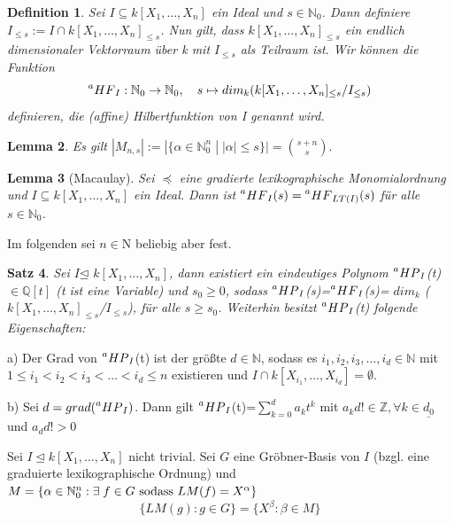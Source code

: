 \documentclass{article}
\newtheorem{satz}{Satz}
\newtheorem{definition}[satz]{Definition}
\newtheorem{lemma}[satz]{Lemma}
\newcommand*{\R}{k[X_{1},\ldots,X_{n}]}
\newcommand*{\indx}[2]{{#1}_{#2}}
\newcommand*{\potx}[2]{{#1}^{#2}}
\newcommand*{\N}{\mathbb{N}_0}
\newcommand*{\hf}[1]{$\prescript{a}{}{HF}_{#1}$}
\newcommand*{\hp}[1]{$\prescript{a}{}{HP}_{#1}$}
\newcommand*{\kette}[2]{$1\leq {#1}_1<{#1}_2<{#1}_3<...<{#1}_{#2}\leq n$}
\newcommand*{\dkette}[2]{${#1}_1,{#1}_2,{#1}_3,\ldots,{#1}_{#2} \in \mathbb{N}$}
\newcommand*{\ideal}{$I$}
\begin{document}
	\begin{definition} \label{1.2.11}
	Sei \(I \subseteq \R\) ein Ideal und \(s \in \mathbb{N}_{0}\). Dann definiere \(I_{\leq s} :=
	I \cap \R_{\leq s}\). Nun gilt, dass \(\R_{\leq s}\) ein endlich dimensionaler Vektorraum über
	k  mit \(I_{\leq s}\) als Teilraum ist. Wir können die Funktion \begin{displaymath}
	\prescript{a}{}{HF}_{I} : \mathbb{N}_{0} \rightarrow \mathbb{N}_{0}, \quad s \mapsto
	dim_{k}(\R_{\leq s}/I_{\leq s})	\end{displaymath} definieren, die (affine) Hilbertfunktion
	von I genannt wird.
	\end{definition}

	\begin{lemma}
	Es gilt \(|M_{n,s}| := |\{\alpha \in \mathbb{N}^{n}_{0}\; |\; |\alpha| \leq s \}| = \binom{s + n}{s}. \)
	\end{lemma}

	\begin{lemma}[Macaulay] \label{1.2.13}
	Sei \(\preceq\) eine gradierte lexikographische Monomialordnung und \(I \subseteq \R\) ein
	Ideal. Dann ist \(\prescript{a}{}{HF}_{I}(s) = \prescript{a}{}{HF}_{LT(I)}(s)\) für alle
	\(s \in \mathbb{N}_{0}\).
	\end{lemma}


Im folgenden sei $n \in \mathrm{N}$ beliebig aber fest.

\begin{satz}
	\label{1.2.14}
	Sei  \ideal $\unlhd$ $\R$, dann existiert ein eindeutiges Polynom \hp{I}(t) $\in \mathbb{Q}[t]$ (t ist eine Variable) und $\indx{s}{0}\geq0$,  sodass \hp{I}(s)=\hf{I}(s)= $\indx{dim}{k}$ ($\indx{\R}{\leq s}$/$\indx{I}{\leq s}$), für alle $ s\geq\indx{s}{0}$. Weiterhin besitzt \hp{I}(t) folgende Eigenschaften:	
\end{satz}
\begin{compactenum}
	\item[a)] Der Grad von \hp{I}(t) ist der größte $d \in \mathbb{N}$, sodass es \dkette{i}{d} mit \kette{i}{d} existieren und $I\cap k[X_{{i}_{1}},\ldots,X_{{i}_{d}}]={\emptyset}$.
	\item[b)] Sei $d=grad(\textnormal{\hp{I}})$. Dann gilt \hp{I}(t)=$\sum_{k=0}^{d} \indx{a}{k}t^k$ mit $\indx{a}{k}d! \in \mathbb{Z}, \forall k\in \underline{\indx{d}{0}}$ und $\indx{a}{d}d!>0$\\
\end{compactenum}

Sei $I\unlhd \R$ nicht trivial. Sei $G$ eine Gröbner-Basis von $I$ (bzgl. eine graduierte lexikographische Ordnung) und $M=\{\alpha \in \N^n:\exists\;f\in G \textnormal{ sodass } LM(f)=\potx{X}{\alpha}\}$
\begin{displaymath}
\{LM(g):g\in G\}=\{\potx{X}{\beta}:\beta \in M \}
\end{displaymath}
\end{document}
